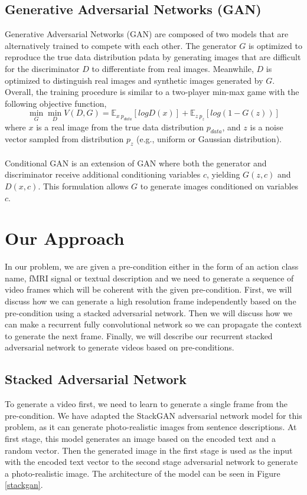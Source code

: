 \documentclass{article}
\begin{document}
\subsection{Generative Adversarial Networks (GAN)}
\label{generative_adversarial_networks}
Generative Adversarial Networks (GAN) \cite{gan2014} are composed of two models that are alternatively trained to compete with each other. The generator $G$ is optimized to reproduce the true data distribution pdata by generating images that are difficult for the discriminator $D$ to differentiate from real images. Meanwhile, $D$ is optimized to distinguish real images and synthetic images generated by $G$. Overall, the training procedure is similar to a two-player min-max game with the following objective function,
$$\mathop{min}_{G} \mathop{min}_{D} V(D,G) = \mathbb{E}_{x~p_{data}} [log D(x)] + \mathbb{E}_{z~p_z} [log (1-G(z))]$$
where $x$ is a real image from the true data distribution $p_{data}$, and $z$ is a noise vector sampled from distribution $p_z$ (e.g., uniform or Gaussian distribution). 
\\\\
Conditional GAN \cite{faceGan2015, condGan2014} is an extension of GAN where both the generator and discriminator receive additional conditioning variables $c$, yielding $G(z,c)$ and $D(x,c)$. This formulation allows $G$ to generate images conditioned on variables $c$.


%
%
\section{Our Approach}
\label{our_approach}
In our problem, we are given a pre-condition either in the form of an action class name, fMRI signal or textual description and we need to generate a sequence of video frames which will be coherent with the given pre-condition. First, we will discuss how we can generate a high resolution frame independently based on the pre-condition using a stacked adversarial network. Then we will discuss how we can make a recurrent fully convolutional network so we can propagate the context to generate the next frame. Finally, we will describe our recurrent stacked adversarial network to generate videos based on pre-conditions.

\subsection{Stacked Adversarial Network}
To generate a video first, we need to learn to generate a single frame from the pre-condition. We have adapted the  StackGAN adversarial network model \cite{stackGAN} for this problem, as it can generate photo-realistic images from sentence descriptions. At first stage, this model generates an image based on the encoded text and a random vector. Then the generated image in the first stage is used as the input with the encoded text vector to the second stage adversarial network to generate a photo-realistic image. The architecture of the model can be seen in Figure \ref{stackgan}.
\end{document}
